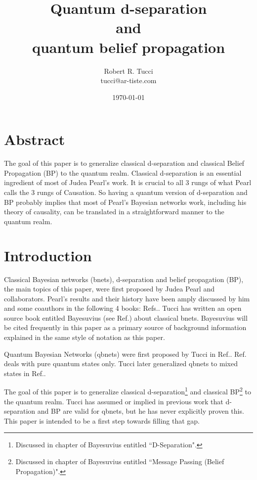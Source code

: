 \documentclass[12pt]{article}
\begin{document}
\title{Quantum d-separation\\
and\\
quantum belief propagation}
\date{ \today}
\author{Robert R. Tucci\\
        tucci@ar-tiste.com}
\maketitle
\vskip2cm
\section*{Abstract}
The goal of this paper is to generalize
classical d-separation
 and 
classical Belief Propagation (BP)
 to the quantum realm.
Classical d-separation
is 
an essential ingredient of most of Judea Pearl's 
work. It 
is crucial
to all 3 rungs of 
what Pearl calls the 3 rungs
of Causation.
So having a quantum version
of d-separation
and BP
probably 
implies
that most of Pearl's
Bayesian networks
work, 
including
his theory of
causality, 
can be translated
in a straightforward 
manner to
the quantum realm.
\newpage
\section{Introduction}

Classical Bayesian networks (bnets),
 d-separation
and belief propagation (BP), the main topics 
of this paper, were first proposed  
by Judea Pearl and collaborators. Pearl's results 
and their history
have been amply discussed by
him and some coauthors in 
the following 4 books:
Refs.\cite{pearl-1988book,pearl-2013book,
pearl-primer,book-why}.
Tucci has written 
 an open source book entitled
Bayesuvius (see Ref.\cite{bayesuvius}) about
classical bnets.
Bayesuvius will
be cited frequently in this paper as
a primary source of 
background information
explained in the same style
of notation as this paper. 

Quantum Bayesian Networks (qbnets) were 
first proposed by Tucci in Ref.\cite{qbnets1}.
Ref.\cite{qbnets1} deals with pure quantum states only.
Tucci later generalized qbnets 
to mixed states
in
Ref.\cite{qbnets-mixed}.

The goal of this paper is to generalize
classical d-separation\footnote{Discussed 
in chapter of Bayesuvius entitled 
``D-Separation".}
 and 
classical BP\footnote{Discussed 
in chapter of Bayesuvius entitled 
``Message Passing (Belief Propagation)".}
 to the quantum realm.
Tucci has assumed or implied
in previous work that d-separation
and BP
are valid for qbnets, but he
has never explicitly proven  this.
This paper is intended to be a first
step towards filling that gap.
\end{document}

